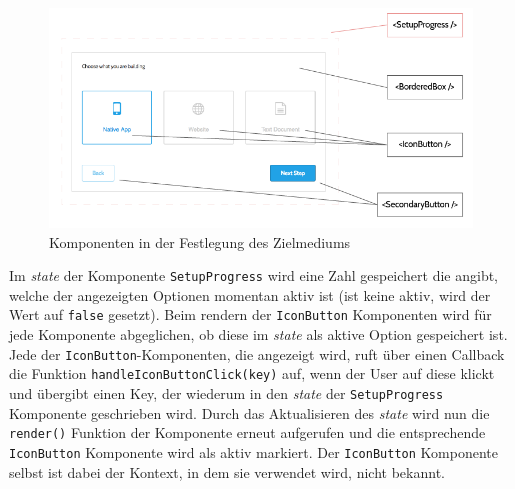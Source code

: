 \begin{figure}[h]
    \centering
    \includegraphics[width=1\textwidth]{images/components.png}
    \caption{Komponenten in der Festlegung des Zielmediums}
    \label{fig:components}
\end{figure}


Im \textit{state} der Komponente \verb|SetupProgress| wird eine Zahl gespeichert die angibt, welche der angezeigten Optionen momentan aktiv ist (ist keine aktiv, wird der Wert auf \verb|false| gesetzt). Beim rendern der \verb|IconButton| Komponenten wird für jede Komponente abgeglichen, ob diese im \textit{state} als aktive Option gespeichert ist. Jede der \verb|IconButton|-Komponenten, die angezeigt wird, ruft über einen Callback die Funktion \verb|handleIconButtonClick(key)| auf, wenn der User auf diese klickt und übergibt einen Key, der wiederum in den \textit{state} der  \verb|SetupProgress| Komponente geschrieben wird. Durch das Aktualisieren des \textit{state} wird nun die \verb|render()| Funktion der Komponente erneut aufgerufen und die entsprechende \verb|IconButton| Komponente wird als aktiv markiert.
Der  \verb|IconButton| Komponente selbst ist dabei der Kontext, in dem sie verwendet wird, nicht bekannt.


